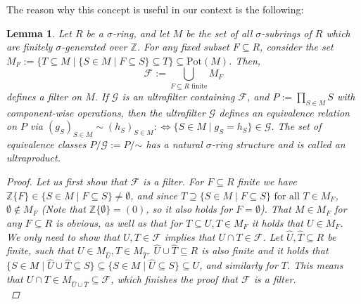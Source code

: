 \documentclass{article}
\def\Z{\mathbb{Z}}
\def\s{\sigma}
\def\fa{\text{ for all }}
\newcommand{\textsim}{\mathord{\sim}}
\theoremstyle{plain}
\newtheorem{lem}[Satz]{Lemma}
\theoremstyle{definition}
\begin{document}
The reason why this concept is useful in our context is the following:

\begin{lem}\label{lemmafilters}
Let $R$ be a $\s$-ring, and let $M$ be the set of all $\s$-subrings of $R$ which are finitely $\s$-generated over $\Z$. For any fixed subset $F \subseteq R$, consider the set $M_F:= \{ T \subseteq M \mid \{S \in M \mid F \subseteq S \} \subseteq T \} \subseteq \text{Pot}(M)$. 
Then, \[ \mathcal{F}:= \bigcup_{ F \subseteq R \text{ finite} } M_F \]
 defines a filter on $M$. If $\mathcal{G}$ is an ultrafilter containing $\mathcal{F}$, and $P:= \prod_{S \in M} S$ with component-wise operations,
 then the ultrafilter $\mathcal{G}$ defines an equivalence relation on $P$ via $(g_S)_{S \in M} \sim (h_S)_{S \in M} : \Leftrightarrow \{ S \in M \mid g_S = h_S \} \in \mathcal{G}$. 
The set of equivalence classes $P/\mathcal{G}:= P/\textsim$ has a natural $\s$-ring structure and is called an \emph{ultraproduct}.  %
\begin{proof}
Let us first show that $\mathcal{F}$ is a filter. For $F \subseteq R$ finite we have $\Z\{F\} \in \{ S \in M \mid F \subseteq S \} \neq \emptyset$, and since $T \supseteq \{ S \in M \mid F \subseteq S \} \fa T \in M_F$, $\emptyset \notin M_F$ (Note that $\Z\{\emptyset\} = (0)$, so it also holds for $F = \emptyset$).
  That $M \in M_F$ for any $F \subseteq R$ is obvious, as well as that for $T \subseteq U, T \in M_F$ it holds that $U \in M_F$. \\ 
\indent We only need to show that $U,T \in \mathcal{F}$ implies that $U \cap T \in \mathcal{F}$.
  Let $\hat U, \hat T \subseteq R$ be finite, such that $U \in M_{\hat U}, T \in M_{\hat T}$. $\hat U \cup \hat T \subseteq R$ is also finite and it holds that  $\{ S \in M \mid \hat U \cup \hat T \subseteq S \} \subseteq \{ S \in M \mid \hat U \subseteq S \} \subseteq U$,
 and similarly for $T$. This means that $U \cap T \in M_{\hat U \cup \hat T} \subseteq \mathcal{F}$, which finishes the proof that $\mathcal{F}$ is a filter. \\


\end{proof}
\end{lem}
\end{document}
